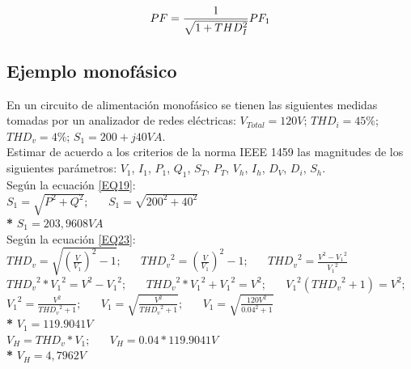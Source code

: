 \begin{equation}\label{EQ34}
PF=\frac{1}{\sqrt{1+THD^2_{I}}}PF_{1}\\
\end{equation}

\subsection{Ejemplo monofásico}

En un circuito de alimentación monofásico se tienen las siguientes medidas tomadas por un analizador de redes eléctricas: $V_{Total}=120 V$;  $THD_{i}= 45\%$; $THD_{v}= 4\%$; $S_{1}= 200 + j40 VA$.\\

Estimar de acuerdo a los criterios de la norma IEEE 1459 las magnitudes de los siguientes parámetros: $V_{1}$, $I_{1}$, $P_{1}$, $Q_{1}$, $S_{T}$, $P_{T}$, $V_{h}$, $I_{h}$, $D_{V}$, $D_{i}$, $S_{h}$.\\

Según la ecuación \ref{EQ19}:\\

$S_{1} = \sqrt{P^2 + Q^2}; \;\;\;\;\;\; S_{1} = \sqrt{200^2 + 40^2} $\\

\textbf{* }$S_{1} = 203,9608 VA$\\

Según la ecuación \ref{EQ23}:\\

$THD_{v}=\sqrt{\left(\frac{V}{V_{1}}\right)^2-1} ;  \;\;\;\;\;\; {THD_{v}}^2=\left(\frac{V}{V_{1}}\right)^2 - 1;  \;\;\;\;\;\;
{THD_{v}}^2=\frac{{V}^2 - {{V}_{1}}^2}{{V_{1}}^2} $\\

${THD_{v}}^2*{{V_{1}}^2}={{V}^2 - {{V}_{1}}^2}; \;\;\;\;\;\;
{THD_{v}}^2*{{V_{1}}^2} + {{V}_{1}}^2={{V}^2}; \;\;\;\;\;\;
{V_{1}}^2 ({THD_{v}}^2 + 1)={{V}^2}; \;\;\;\;\;\;$\\

${V_{1}}^2 = \frac{{{V}^2}}{{THD_{v}}^2 + 1}; \;\;\;\;\;\;
V_{1} = \sqrt{\frac{{{V}^2}}{{THD_{v}}^2 + 1}}; \;\;\;\;\;\;
V_{1} = \sqrt{\frac{{{120V}^2}}{{0.04}^2 + 1}}$\\

\textbf{* }$V_{1} = 119.9041V$\\

$V_{H} = THD_{v}*V_{1};  \;\;\;\;\;\;
V_{H} = 0.04 * 119.9041V$\\

\textbf{* }$V_{H} = 4,7962 V$\\

